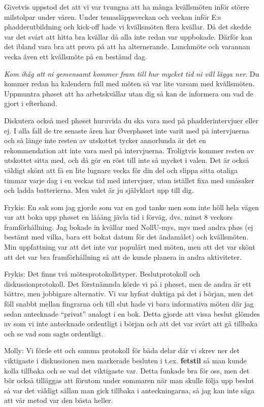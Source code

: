 \documentclass[10pt]{article}
\begin{document}
    Givetvis uppstod det att vi var tvungna att ha många kvällsmöten inför större milstolpar under våren. Under temasläppsveckan och veckan inför E:s phadderutbildning och kick-off hade vi kvällsmöten flera kvällar. Då det skedde var det svårt att hitta bra kvällar då alla inte redan var uppbokade. Därför kan det ibland vara bra att prova på att ha alternerande. Lunchmöte och varannan vecka även ett kvällsmöte på en bestämd dag.

    \textit{Kom ihåg att ni gemensamt kommer fram till hur mycket tid ni vill lägga ner}. Du kommer redan ha kalendern full med möten så var lite varsam med kvällsmöten. Uppmuntra phøset att ha arbetskvällar utan dig så kan de informera om vad de gjort i efterhand.

    Diskutera också med phøset huruvida du ska vara med på phadderintervjuer eller ej. I alla fall de tre senaste åren har Øverphøset inte varit med på intervjuerna och så länge inte resten av utskottet tycker annorlunda är det en rekommendation att inte vara med på intervjuerna. Troligtvis kommer resten av utskottet sitta med, och då gör en röst till inte så mycket i valen. Det är också väldigt skönt att få en lite lugnare vecka för din del och slippa sitta otaliga timmar varje dag i en veckas tid med intervjuer, utan istället fixa med småsaker och ladda batterierna. Men valet är ju självklart upp till dig.

    Frykis: En sak som jag gjorde som var en god tanke men som inte höll hela vägen var att boka upp phøset en lååång jävla tid i förväg, dvs. minst 8 veckors framförhållning. Jag bokade in kvällar med NollU-mys, mys med andra phøs (ej bestämt med vilka, bara ett bokat datum för det ändamålet) och kvällsmöten. Min uppfattning var att det inte var populärt med möten, men att det var skönt att det var bra framförhållning så att de kunde planera in andra aktiviteter.

    Frykis: Det finns två mötesprotokollstyper. Beslutprotokoll och diskussionprotokoll. Det förstnämnda körde vi på i phøset, men de andra är ett bättre, men jobbigare alternativ. Vi var hyfsat duktiga på det i början, men det föll snabbt mellan fingrarna och till slut hade vi bara informativa möten där jag sedan antecknade ``privat'' analogt i en bok. Detta gjorde att vissa beslut glömdes av som vi inte antecknade ordentligt i början och att det var svårt att gå tillbaka och se vad som sagts ordentligt.

    Molly: Vi förde ett och samma protokoll för båda delar där vi skrev ner det viktigaste i diskussionen men markerade besluten i t.ex. \textbf{fetstil} så man kunde kolla tillbaka och se vad det viktigaste var. Detta funkade bra för oss, men det bör också tilläggas att förutom under sommaren när man skulle följa upp beslut så var det väldigt sällan man gick tillbaka i anteckningarna, så jag kan inte säga att vår metod var den bästa heller.
    
\end{document}
